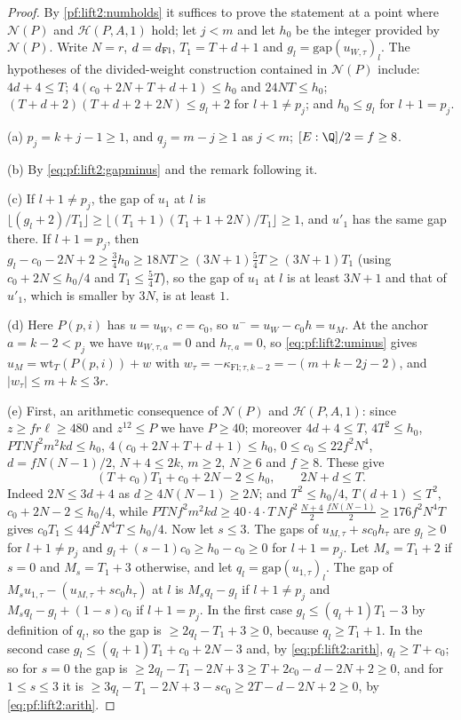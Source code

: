 \begin{proof}
By \cref{pf:lift2:numholds} it suffices to prove the statement at a point where $\mathcal N(P)$ and $\mathcal H(P,A,1)$
hold; let $j<m$ and let $h_0$ be the integer provided by $\mathcal N(P)$. Write $N=r$, $d=d_{\mathrm{Fl}}$, $T_1=T+d+1$ and
$g_l=\mathrm{gap}(u_{W,\tau})_l$. The hypotheses of the divided-weight construction contained in $\mathcal N(P)$
include: $4d+4\le T$; $4(c_0+2N+T+d+1)\le h_0$ and $24NT\le h_0$; $(T+d+2)(T+d+2+2N)\le g_l+2$ for $l+1\ne p_j$; and
$h_0\le g_l$ for $l+1=p_j$.

(a) $p_j=k+j-1\ge1$, and $q_j=m-j\ge1$ as $j<m$; $[E:\Q]/2=f\ge8$.

(b) By \eqref{eq:pf:lift2:gapminus} and the remark following it.

(c) If $l+1\ne p_j$, the gap of $u_1$ at $l$ is $\lfloor(g_l+2)/T_1\rfloor\ge\lfloor(T_1+1)(T_1+1+2N)/T_1\rfloor\ge1$,
and $u'_1$ has the same gap there. If $l+1=p_j$, then $g_l-c_0-2N+2\ge\frac34h_0\ge18NT\ge(3N+1)\frac54T\ge(3N+1)T_1$
(using $c_0+2N\le h_0/4$ and $T_1\le\frac54T$), so the gap of $u_1$ at $l$ is at least $3N+1$ and that of $u'_1$, which
is smaller by $3N$, is at least $1$.

(d) Here $P(p,i)$ has $u=u_W$, $c=c_0$, so $u^-=u_W-c_0h=u_M$. At the anchor $a=k-2<p_j$ we have $u_{W,\tau,a}=0$ and
$h_{\tau,a}=0$, so \eqref{eq:pf:lift2:uminus} gives $u_M=\mathrm{wt}_T(P(p,i))+w$ with
$w_\tau=-\kappa_{\mathrm{Fl};\tau,k-2}=-(m+k-2j-2)$, and $|w_\tau|\le m+k\le3r$.

(e) First, an arithmetic consequence of $\mathcal N(P)$ and $\mathcal H(P,A,1)$: since $z\ge f r\ell\ge480$ and
$z^{12}\le P$ we have $P\ge40$; moreover $4d+4\le T$, $4T^2\le h_0$, $PTNf^2m^2kd\le h_0$, $4(c_0+2N+T+d+1)\le h_0$,
$0\le c_0\le22f^2N^4$, $d=fN(N-1)/2$, $N+4\le2k$, $m\ge2$, $N\ge6$ and $f\ge8$. These give
\begin{equation}\label{eq:pf:lift2:arith}
(T+c_0)T_1+c_0+2N-2\le h_0,\qquad 2N+d\le T .
\end{equation}
Indeed $2N\le3d+4$ as $d\ge4N(N-1)\ge2N$; and $T^2\le h_0/4$, $T(d+1)\le T^2$, $c_0+2N-2\le h_0/4$, while
$PTNf^2m^2kd\ge40\cdot4\cdot T\,N f^2\,\frac{N+4}2\,\frac{fN(N-1)}2\ge176f^2N^4T$ gives $c_0T_1\le44f^2N^4T\le h_0/4$.
Now let $s\le3$. The gaps of $u_{M,\tau}+sc_0h_\tau$ are $g_l\ge0$ for $l+1\ne p_j$ and $g_l+(s-1)c_0\ge h_0-c_0\ge0$ for
$l+1=p_j$. Let $M_s=T_1+2$ if $s=0$ and $M_s=T_1+3$ otherwise, and let $q_l=\mathrm{gap}(u_{1,\tau})_l$. The gap of
$M_su_{1,\tau}-(u_{M,\tau}+sc_0h_\tau)$ at $l$ is $M_sq_l-g_l$ if $l+1\ne p_j$ and $M_sq_l-g_l+(1-s)c_0$ if $l+1=p_j$. In
the first case $g_l\le(q_l+1)T_1-3$ by definition of $q_l$, so the gap is $\ge2q_l-T_1+3\ge0$, because
$q_l\ge T_1+1$. In the second case $g_l\le(q_l+1)T_1+c_0+2N-3$ and, by \eqref{eq:pf:lift2:arith}, $q_l\ge T+c_0$; so for
$s=0$ the gap is $\ge2q_l-T_1-2N+3\ge T+2c_0-d-2N+2\ge0$, and for $1\le s\le3$ it is
$\ge3q_l-T_1-2N+3-sc_0\ge2T-d-2N+2\ge0$, by \eqref{eq:pf:lift2:arith}.
\end{proof}

